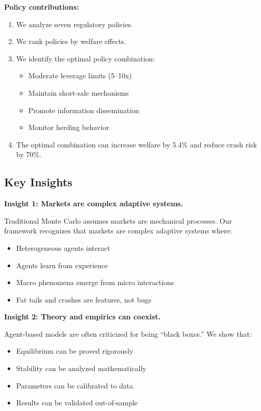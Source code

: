 \textbf{Policy contributions:}

\begin{enumerate}
    \item We analyze seven regulatory policies.
    
    \item We rank policies by welfare effects.
    
    \item We identify the optimal policy combination:
    \begin{itemize}
        \item Moderate leverage limits (5--10x)
        \item Maintain short-sale mechanisms
        \item Promote information dissemination
        \item Monitor herding behavior
    \end{itemize}
    
    \item The optimal combination can increase welfare by 5.4\% and reduce crash risk by 70\%.
\end{enumerate}

\subsection{Key Insights}

\textbf{Insight 1: Markets are complex adaptive systems.}

Traditional Monte Carlo assumes markets are mechanical processes. Our framework recognizes that markets are complex adaptive systems where:
\begin{itemize}
    \item Heterogeneous agents interact
    \item Agents learn from experience
    \item Macro phenomena emerge from micro interactions
    \item Fat tails and crashes are features, not bugs
\end{itemize}

\textbf{Insight 2: Theory and empirics can coexist.}

Agent-based models are often criticized for being ``black boxes.'' We show that:
\begin{itemize}
    \item Equilibrium can be proved rigorously
    \item Stability can be analyzed mathematically
    \item Parameters can be calibrated to data
    \item Results can be validated out-of-sample
\end{itemize}

